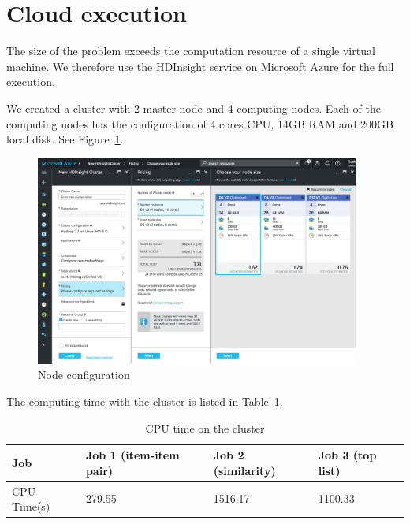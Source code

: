 \section{Cloud execution}
The size of the problem exceeds the computation resource of a single
virtual machine. We therefore use the HDInsight service on Microsoft
Azure for the full execution.

We created a cluster with 2 master node and 4 computing nodes. Each of
the computing nodes has the configuration of 4 cores CPU, 14GB RAM and
200GB local disk. See Figure~\ref{fig:node}.
\begin{figure}[!ht]
  \centering
  \includegraphics[width=0.95\textwidth]{images/node}
  \caption{Node configuration}
  \label{fig:node}
\end{figure}

The computing time with the cluster is listed in Table~\ref{tab:clustertime}.
\begin{table}[!ht]
  \centering
  \begin{tabular}{|p{2.5cm}|p{4cm}|p{3cm}|p{3cm}|}
    \hline
    Job & Job 1 (item-item pair) & Job 2 (similarity) & Job 3 (top list)\\
    \hline
    CPU Time(s) & 279.55 & 1516.17 & 1100.33\\
    \hline
  \end{tabular}
  \caption{CPU time on the cluster}
  \label{tab:clustertime}
\end{table}
